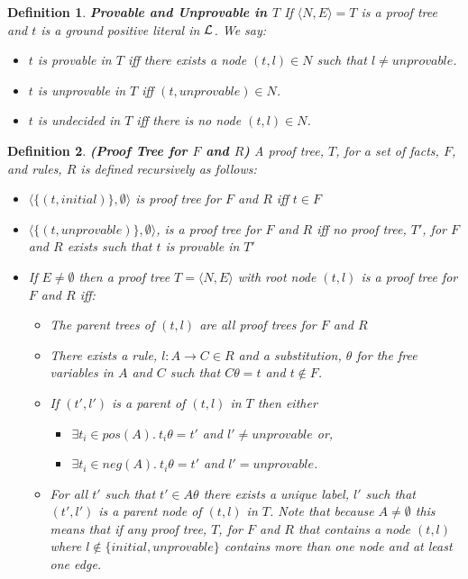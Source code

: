 \documentclass{blue-book}
\newtheorem{definition}{Definition}
\newcommand{\drule}[3]{\ensuremath{#1:#2 \rightarrow #3}}
\newcommand{\pt}[2]{\ensuremath{\langle #1,#2 \rangle}}
\newcommand{\node}[2]{\ensuremath{(#1, #2)}}
\begin{document}
\begin{definition}{\bf Provable and Unprovable in $T$}
If $\langle N, E \rangle = T$ is a proof tree and $t$ is a ground positive literal in ${\cal L}$.  We say:
\begin{itemize}
\item $t$ is \emph{provable} in $T$ iff there exists a node $\node{t}{l} \in N$ such that $l \neq unprovable$.
\item $t$ is \emph{unprovable} in $T$ iff $\node{t}{unprovable} \in N$.
\item $t$ is \emph{undecided} in $T$ iff there is no node $\node{t}{l} \in N$.
\end{itemize}
\end{definition}

\begin{definition}{\bf (Proof Tree for $F$ and $R$)}
A \emph{proof tree}, $T$, for a set of facts, $F$, and rules, $R$ is defined recursively as follows:

\begin{itemize}
\item $\pt{\{\node{t}{initial}\}}{\emptyset}$ is proof tree for $F$ and $R$ iff $t \in F$
\item $\pt{\{\node{t}{unprovable} \}}{\emptyset}$, is a proof tree for $F$ and $R$ iff no proof tree, $T'$, for $F$ and $R$ exists such that $t$ is provable in $T'$
\item If $E \neq \emptyset$ then a proof tree $T = \pt{N}{E}$ with root node $\node{t}{l}$ is a proof tree for $F$ and $R$ iff:

\begin{itemize}
\item The parent trees of $\node{t}{l}$ are all proof trees for $F$ and $R$
\item There exists a rule, $\drule{l}{A}{C} \in R$ and a substitution, $\theta$ for the free variables in $A$ and $C$ such that $C\theta = t$ and $t \not\in F$.
\item If $\node{t'}{l'}$ is a parent of $\node{t}{l}$ in $T$ then either 
\begin{itemize} 
\item $\exists t_i \in pos(A). \: t_i\theta = t'$ and $l' \neq unprovable$ or, 
\item $\exists t_i \in neg(A).  \: t_i\theta = t'$ and $l' = unprovable$.
\end{itemize}
\item For all $t'$ such that $t' \in A\theta$ there exists a unique label, $l'$ such that $\node{t'}{l'}$ is a parent node of $\node{t}{l}$ in $T$.  Note that because $A \neq \emptyset$ this means that if any proof tree, $T$, for $F$ and $R$ that contains a node $\node{t}{l}$ where $l \not\in \{initial,unprovable\}$ contains more than one node and at least one edge.
\end{itemize}
\end{itemize}
\end{definition}
\end{document}
